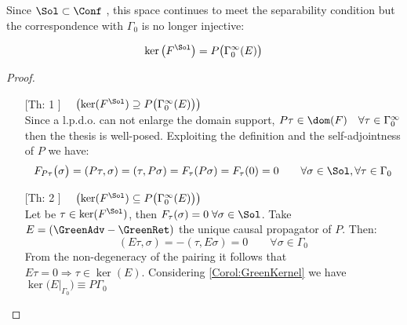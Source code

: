 \documentclass[Main]{subfiles}
\begin{document}
   				Since $\Sol \subset \Conf$ , this space continues to meet the separability condition but the correspondence with  $\Gamma_0$ is no longer injective:
					\begin{proposition}\label{Teo:NspaceDefinition}
						\begin{displaymath}
							\ker \big( F^\Sol \big) = P \big( \Gamma_0^\infty (E) \big)	
						\end{displaymath}
					\end{proposition}
					\begin{proof}
					\forcenewline
						\begin{itemize}
							\item[[Th: 1]] $\quad \left( \ker(F^\Sol) \supseteq  P \big( \Gamma_0^\infty (E) \big) \right)$\\
								Since a l.p.d.o. can not enlarge the domain support, $ P \tau \in \dom(F) \quad \forall \tau \in \Gamma_0^\infty$ then the thesis is well-posed.
								Exploiting the definition and the self-adjointness of $P$ we have:
								\begin{displaymath}
									F_{P\tau} \big( \sigma \big) = ( P\tau, \sigma) = (\tau, P\sigma) = F_\tau (P\sigma)= F_\tau(0) = 0 \qquad \forall \sigma \in \Sol, \forall \tau \in \Gamma_0
								\end{displaymath}
							\item[[Th: 2]] $\quad \left( \ker(F^\Sol) \subseteq  P \big( \Gamma_0^\infty (E) \big) \right)$\\
								Let be $	\tau \in \ker(F^\Sol)$, then $F_\tau (\sigma) =0 \; \forall \sigma \in \Sol$.
								Take $E= \left( \GreenAdv- \GreenRet \right)$	 the unique causal propagator of $P$.
								Then:
								\begin{displaymath}
									(E \tau , \sigma) = - (\tau , E \sigma) = 0 \qquad \forall \sigma \in \Gamma_0
								\end{displaymath}
								From the non-degeneracy of the pairing it follows that $E\tau = 0 \Rightarrow  \tau \in \ker(E)$.
								Considering \ref{Corol:GreenKernel} we have $ \ker \big(E\big\vert_{\Gamma_0} \big) \equiv P \Gamma_0$
						\end{itemize}
					\end{proof}
\end{document}
